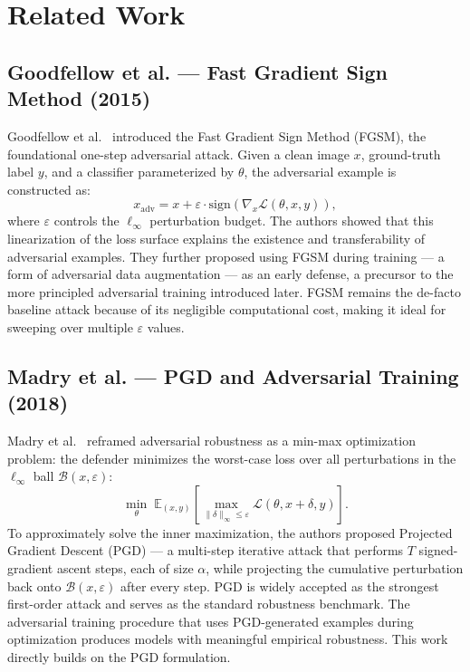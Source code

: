 \documentclass[conference]{IEEEtran}
\begin{document}
\section{Related Work}

\subsection{Goodfellow et al. — Fast Gradient Sign Method (2015)}

Goodfellow et al.~\cite{goodfellow2015fgsm} introduced the Fast Gradient
Sign Method (FGSM), the foundational one-step adversarial attack. Given a
clean image $x$, ground-truth label $y$, and a classifier parameterized by
$\theta$, the adversarial example is constructed as:
\begin{equation}
    x_{\mathrm{adv}} = x + \varepsilon \cdot
    \mathrm{sign}\!\left(\nabla_x \mathcal{L}(\theta, x, y)\right),
    \label{eq:fgsm}
\end{equation}
where $\varepsilon$ controls the $\ell_\infty$ perturbation budget. The
authors showed that this linearization of the loss surface explains the
existence and transferability of adversarial examples.
They further proposed using FGSM during training — a form of adversarial
data augmentation — as an early defense, a precursor to the more principled
adversarial training introduced later. FGSM remains the de-facto baseline
attack because of its negligible computational cost, making it ideal for
sweeping over multiple $\varepsilon$ values.

\subsection{Madry et al. — PGD and Adversarial Training (2018)}

Madry et al.~\cite{madry2018pgd} reframed adversarial robustness as a
min-max optimization problem: the defender minimizes the worst-case loss
over all perturbations in the $\ell_\infty$ ball $\mathcal{B}(x,\varepsilon)$:
\begin{equation}
    \min_\theta \; \mathbb{E}_{(x,y)} \left[
        \max_{\|\delta\|_\infty \leq \varepsilon}
        \mathcal{L}(\theta, x{+}\delta, y)
    \right].
    \label{eq:pgd_objective}
\end{equation}
To approximately solve the inner maximization, the authors proposed
Projected Gradient Descent (PGD) — a multi-step iterative attack that
performs $T$ signed-gradient ascent steps, each of size $\alpha$, while
projecting the cumulative perturbation back onto $\mathcal{B}(x,\varepsilon)$
after every step. PGD is widely accepted as the strongest first-order attack
and serves as the standard robustness benchmark. The adversarial training
procedure that uses PGD-generated examples during optimization produces
models with meaningful empirical robustness. This work directly builds on
the PGD formulation.
\end{document}
